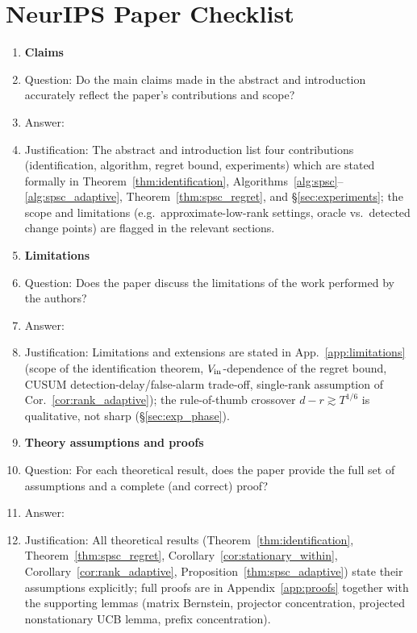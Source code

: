\section*{NeurIPS Paper Checklist}

\begin{enumerate}

\item {\bf Claims}
    \item[] Question: Do the main claims made in the abstract and introduction accurately reflect the paper's contributions and scope?
    \item[] Answer: \answerYes{}
    \item[] Justification: The abstract and introduction list four contributions (identification, algorithm, regret bound, experiments) which are stated formally in Theorem~\ref{thm:identification}, Algorithms~\ref{alg:spsc}--\ref{alg:spsc_adaptive}, Theorem~\ref{thm:spsc_regret}, and \S\ref{sec:experiments}; the scope and limitations (e.g.\ approximate-low-rank settings, oracle vs.\ detected change points) are flagged in the relevant sections.

\item {\bf Limitations}
    \item[] Question: Does the paper discuss the limitations of the work performed by the authors?
    \item[] Answer: \answerYes{}
    \item[] Justification: Limitations and extensions are stated in App.~\ref{app:limitations} (scope of the identification theorem, $V_{\rm in}$-dependence of the regret bound, CUSUM detection-delay/false-alarm trade-off, single-rank assumption of Cor.~\ref{cor:rank_adaptive}); the rule-of-thumb crossover $d-r\gtrsim T^{1/6}$ is qualitative, not sharp (\S\ref{sec:exp_phase}).

\item {\bf Theory assumptions and proofs}
    \item[] Question: For each theoretical result, does the paper provide the full set of assumptions and a complete (and correct) proof?
    \item[] Answer: \answerYes{}
    \item[] Justification: All theoretical results (Theorem~\ref{thm:identification}, Theorem~\ref{thm:spsc_regret}, Corollary~\ref{cor:stationary_within}, Corollary~\ref{cor:rank_adaptive}, Proposition~\ref{thm:spsc_adaptive}) state their assumptions explicitly; full proofs are in Appendix~\ref{app:proofs} together with the supporting lemmas (matrix Bernstein, projector concentration, projected nonstationary UCB lemma, prefix concentration).


\end{enumerate}

